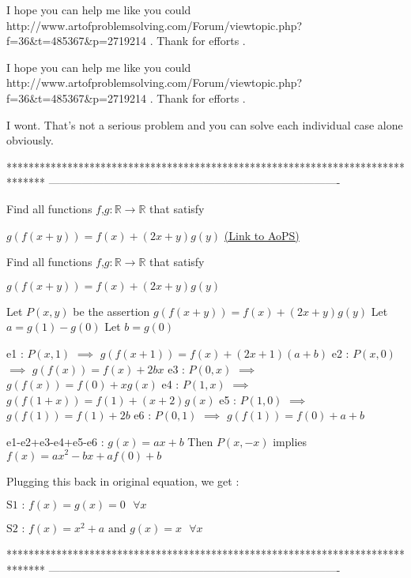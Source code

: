 \begin{solution}
	I hope you can help me  like you could http://www.artofproblemsolving.com/Forum/viewtopic.php?f=36&t=485367&p=2719214 . Thank for efforts .
\end{solution}



\begin{solution}
	\begin{tcolorbox}I hope you can help me  like you could http://www.artofproblemsolving.com/Forum/viewtopic.php?f=36&t=485367&p=2719214 . Thank for efforts .\end{tcolorbox}
I wont.
That's not a serious problem and you can solve each individual case alone obviously.
\end{solution}
*******************************************************************************
-------------------------------------------------------------------------------

\begin{problem}
	Find all  functions $f$,$ g:\mathbb{R}\rightarrow\mathbb{R} $  that satisfy
 
                      $g(f(x+y))=f(x)+(2x+y)g(y)$
	\flushright \href{https://artofproblemsolving.com/community/c6h581665}{(Link to AoPS)}
\end{problem}



\begin{solution}
	\begin{tcolorbox}Find all  functions $f$,$ g:\mathbb{R}\rightarrow\mathbb{R} $  that satisfy
 
                      $g(f(x+y))=f(x)+(2x+y)g(y)$\end{tcolorbox}
Let $P(x,y)$ be the assertion $g(f(x+y))=f(x)+(2x+y)g(y)$
Let $a=g(1)-g(0)$
Let $b=g(0)$

e1 : $P(x,1)$ $\implies$ $g(f(x+1))=f(x)+(2x+1)(a+b)$
e2 : $P(x,0)$ $\implies$ $g(f(x))=f(x)+2bx$
e3 : $P(0,x)$ $\implies$ $g(f(x))=f(0)+xg(x)$
e4 : $P(1,x)$ $\implies$ $g(f(1+x))=f(1)+(x+2)g(x)$
e5 : $P(1,0)$ $\implies$ $g(f(1))=f(1)+2b$
e6 : $P(0,1)$ $\implies$ $g(f(1))=f(0)+a+b$

e1-e2+e3-e4+e5-e6 :  $g(x)=ax+b$
Then $P(x,-x)$ implies $f(x)=ax^2-bx+af(0)+b$

Plugging this back in original equation, we get :

$\boxed{\text{S1 : }f(x)=g(x)=0\text{   }\forall x}$

$\boxed{\text{S2 : }f(x)=x^2+a\text{  and  }g(x)=x\text{   }\forall x}$
\end{solution}
*******************************************************************************
-------------------------------------------------------------------------------

